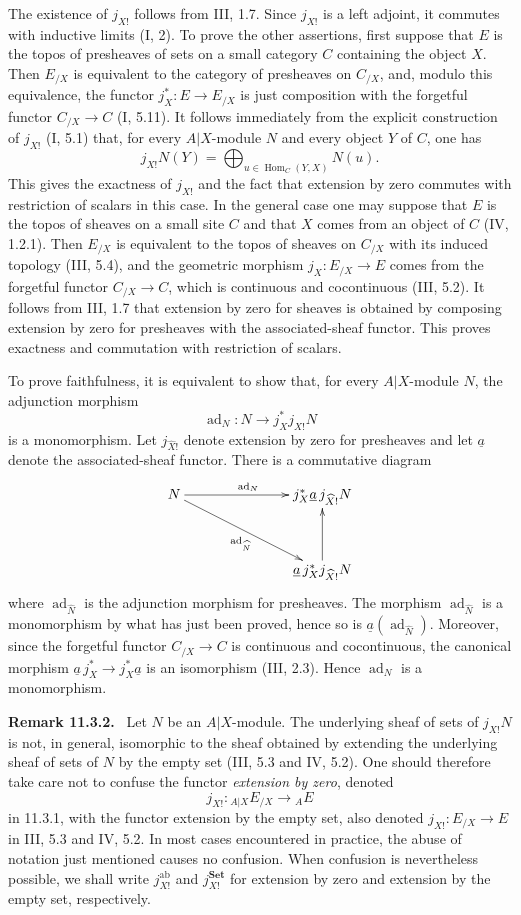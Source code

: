 \documentclass[11pt]{article}
\newcommand{\Set}{\mathbf{Set}}
\newcommand{\Hom}{\operatorname{Hom}}
\newcommand{\ad}{\operatorname{ad}}
\newcommand{\ab}{\mathrm{ab}}
\newenvironment{remarktext}[1]{\par\medskip\noindent\textbf{#1.}\ }{\par\medskip}
\begin{document}
The existence of $j_{X!}$ follows from III, 1.7. Since $j_{X!}$ is a left adjoint, it commutes with inductive limits (I, 2). To prove the other assertions, first suppose that $E$ is the topos of presheaves of sets on a small category $C$ containing the object $X$. Then $E_{/X}$ is equivalent to the category of presheaves on $C_{/X}$, and, modulo this equivalence, the functor $j_X^*:E\to E_{/X}$ is just composition with the forgetful functor $C_{/X}\to C$ (I, 5.11). It follows immediately from the explicit construction of $j_{X!}$ (I, 5.1) that, for every $A|X$-module $N$ and every object $Y$ of $C$, one has
\[
j_{X!}N(Y)=\bigoplus_{u\in\Hom_C(Y,X)}N(u).
\]
This gives the exactness of $j_{X!}$ and the fact that extension by zero commutes with restriction of scalars in this case. In the general case one may suppose that $E$ is the topos of sheaves on a small site $C$ and that $X$ comes from an object of $C$ (IV, 1.2.1). Then $E_{/X}$ is equivalent to the topos of sheaves on $C_{/X}$ with its induced topology (III, 5.4), and the geometric morphism $j_X:E_{/X}\to E$ comes from the forgetful functor $C_{/X}\to C$, which is continuous and cocontinuous (III, 5.2). It follows from III, 1.7 that extension by zero for sheaves is obtained by composing extension by zero for presheaves with the associated-sheaf functor. This proves exactness and commutation with restriction of scalars.

To prove faithfulness, it is equivalent to show that, for every $A|X$-module $N$, the adjunction morphism
\[
\ad_N:N\longrightarrow j_X^*j_{X!}N
\]
is a monomorphism. Let $j_{\widehat X!}$ denote extension by zero for presheaves and let $\underline a$ denote the associated-sheaf functor. There is a commutative diagram
\[
\xymatrix@C=2.6cm@R=1.3cm{
N \ar[r]^{\ad_N} \ar[rd]_{\ad_{\widehat N}} & j_X^*\underline a\,j_{\widehat X!}N\\
& \underline a\,j_X^*j_{\widehat X!}N \ar[u]
}
\]
where $\ad_{\widehat N}$ is the adjunction morphism for presheaves. The morphism $\ad_{\widehat N}$ is a monomorphism by what has just been proved, hence so is $\underline a(\ad_{\widehat N})$. Moreover, since the forgetful functor $C_{/X}\to C$ is continuous and cocontinuous, the canonical morphism $\underline a\,j_X^*\to j_X^*\underline a$ is an isomorphism (III, 2.3). Hence $\ad_N$ is a monomorphism.

\begin{remarktext}{Remark 11.3.2}
Let $N$ be an $A|X$-module. The underlying sheaf of sets of $j_{X!}N$ is not, in general, isomorphic to the sheaf obtained by extending the underlying sheaf of sets of $N$ by the empty set (III, 5.3 and IV, 5.2). One should therefore take care not to confuse the functor \emph{extension by zero}, denoted
\[
j_{X!}:{}_{A|X}E_{/X}\to {}_AE
\]
in 11.3.1, with the functor extension by the empty set, also denoted $j_{X!}:E_{/X}\to E$ in III, 5.3 and IV, 5.2. In most cases encountered in practice, the abuse of notation just mentioned causes no confusion. When confusion is nevertheless possible, we shall write $j^{\ab}_{X!}$ and $j^{\Set}_{X!}$ for extension by zero and extension by the empty set, respectively.
\end{remarktext}
\end{document}
